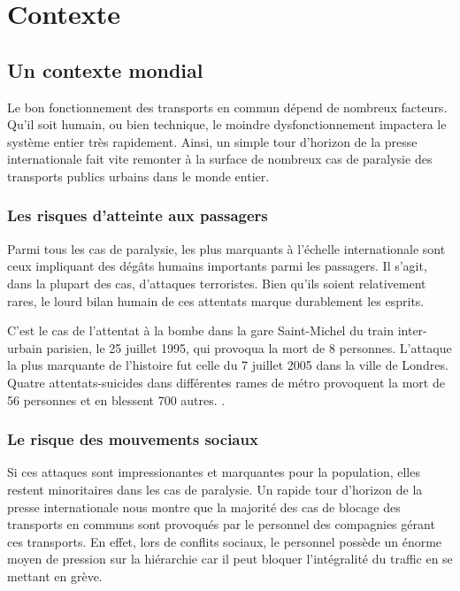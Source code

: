 \section{Contexte}

	\subsection{Un contexte mondial}

	Le bon fonctionnement des transports en commun dépend de nombreux facteurs. Qu'il soit humain, ou bien technique, le moindre dysfonctionnement impactera le système entier très rapidement. Ainsi, un simple tour d'horizon de la presse internationale fait vite remonter à la surface de nombreux cas de paralysie des transports publics urbains dans le monde entier.

		\subsubsection{ Les risques d'atteinte aux passagers }

	Parmi tous les cas de paralysie, les plus marquants à l'échelle internationale sont ceux impliquant des dégâts humains importants parmi les passagers. Il s'agit, dans la plupart des cas, d'attaques terroristes. Bien qu'ils soient relativement rares, le lourd bilan humain de ces attentats marque durablement les esprits.

	C'est le cas de l'attentat à la bombe dans la gare Saint-Michel du train inter-urbain parisien, le 25 juillet 1995, qui provoqua la mort de 8 personnes\cite{stmichel}. L'attaque la plus marquante de l'histoire fut celle du 7 juillet 2005 dans la ville de Londres. Quatre attentats-suicides dans différentes rames de métro provoquent la mort de 56 personnes et en blessent 700 autres. \cite{london_attacks}.

    	\subsubsection{ Le risque des mouvements sociaux }
    	
	Si ces attaques sont impressionantes et marquantes pour la population, elles restent minoritaires dans les cas de paralysie. Un rapide tour d'horizon de la presse internationale nous montre que la majorité des cas de blocage des transports en communs sont provoqués par le personnel des compagnies gérant ces transports. En effet, lors de conflits sociaux, le personnel possède un énorme moyen de pression sur la hiérarchie car il peut bloquer l'intégralité du traffic en se mettant en grève. 

